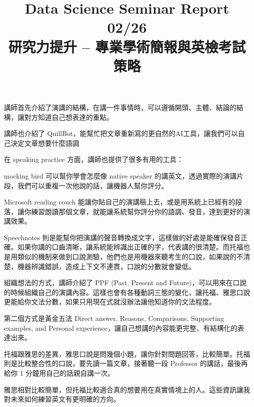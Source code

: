 \documentclass{homework}
\begin{document}
\title{Data Science Seminar Report 02/26 \\ 研究力提升 – 專業學術簡報與英檢考試策略}
\author{\chineseName \masterStudentID}
\date{}
\maketitle

講師首先介紹了演講的結構，在講一件事情時，可以遵循開頭、主體、結論的結構，讓對方知道自己想表達的重點。

講師也介紹了 QuillBot，能幫忙把文章重新寫的更自然的AI工具，讓我們可以自己決定文章想要什麼語調

在 speaking practice 方面，講師也提供了很多有用的工具：

mocking bird 可以幫你學會怎麼像 native speaker 的講英文，透過實際的演講片段，我們可以重複一次他說的話，讓機器人幫你評分。

Microsoft reading couch 能讓你貼自己的演講稿上去，或是用系統上已經有的段落，讓你練習朗讀那個文章，就能讓系統幫你評分你的語調、發音，達到更好的演講效果。

Speechnotes 則是能幫你把演講的聲音轉換成文字，這樣做的好處是能確保發音正確。如果你講的口齒清晰，讓系統能辨識出正確的字，代表講的很清楚。而托福也是用類似的機制來做到口說測驗，他們也是用機器來聽考生的口說，如果說的不清楚，機器辨識錯誤，造成上下文不連貫，口說的分數就會變低。

組織想法的方式，講師介紹了 PPF (Past, Present and Future)，可以用來在口說的時候組織自己的演講內容。這樣也會有各種動詞三態的變化，讓托福、雅思口說更能給你文法分數，如果只用現在式就沒辦法讓他知道你的文法程度。

第二個方式是黃金五法 Direct answer, Reasons, Comparisons, Supporting examples, and Personal experience，讓自己想講的內容能更完整、有結構化的表達出來。

托福跟雅思的差異，雅思口說是問幾個小題，讓你針對問題回答，比較簡單。托福則是比較整合性的口說，要先讀一篇文章，接著聽一段 Professor 的講話，最後再給你 1 分鐘用自己的話親自講一次。

雅思相對比較簡單，但托福比較適合真的想要用在真實情境上的人。這些資訊讓我對未來如何練習英文有更明確的方向。
\end{document}
